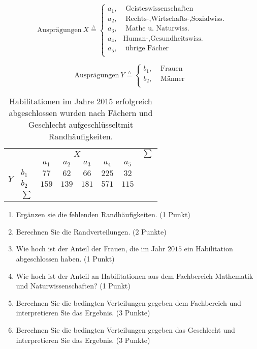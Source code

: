 \documentclass[11pt]{article}
\newcommand{\punkte}[1]{{\small{ }(#1 Punkte)}}
\newcommand{\punkt}[1]{{\small{ }(#1 Punkt)}}
\begin{document}
\begin{enumerate}
   \[
   \text{Ausprägungen} \: X  \overset{\wedge}{=} \left\{\begin{array}{ll} %
         a_1, &  \text{ Geisteswissenschaften} \\
         a_2, &  \text{ Rechts-,Wirtschafts-,Sozialwiss.} \\
         a_3, &  \text{ Mathe u. Naturwiss.} \\
         a_4, &  \text{Human-,Gesundheitswiss.} \\
         a_5, &  \text{ übrige Fächer} \\
        \end{array}\right.
  \]
  
     \[
    \text{Ausprägungen} \:  Y  \overset{\wedge}{=} \left\{\begin{array}{ll}  
         b_1, &  \text{  Frauen} \\
         b_2, &  \text{ Männer } \\
        \end{array}\right.
  \]

\begin{table}[h]
\centering
\begin{tabular}{l l|c|c|c|c|c|c}
\multicolumn{2}{c}{}&\multicolumn{4}{c}{$X$}& &$\sum$\\
\multicolumn{2}{c}{}&$a_{1}$& $a_{2}$& $a_{3}$& $a_{4}$ & $a_{5}$&\\
\cline{3-7}
\multirow{2}{*}{$Y$}& $b_{1}$ & $77 $ & $62$ &  $ 66$ & $225$ & $32$&\\
\cline{2-7}
& $b_{2}$ & $159$ & $139$ &  $181$ & $571$ & $115$&\\
\cline{2-7}
& $\sum$ &  &  &   &  & &\\
\end{tabular}
\caption{Habilitationen im Jahre 2015 erfolgreich abgeschlossen wurden nach Fächern und Geschlecht aufgeschlüsselt\label{tab4} mit Randhäufigkeiten.}
\end{table}
\begin{enumerate}
\item{Ergänzen sie die fehlenden Randhäufigkeiten.} \punkt{1}
\item{Berechnen Sie die Randverteilungen.}\punkte{2}
\item{Wie hoch ist der Anteil der Frauen, die im Jahr $2015$ ein Habilitation abgeschlossen
haben.}\punkt{1}
\item{Wie hoch ist der Anteil an Habilitationen aus dem Fachbereich \glqq Mathematik
und Naturwissenschaften\grqq?}\punkt{1}
\item{Berechnen Sie die  bedingten Verteilungen gegeben dem Fachbereich
und interpretieren Sie das Ergebnis. } \punkte{3}
\item{Berechnen Sie die  bedingten Verteilungen gegeben das Geschlecht
und interpretieren Sie das Ergebnis. } \punkte{3}
\end{enumerate}


\end{enumerate}
\end{document}
